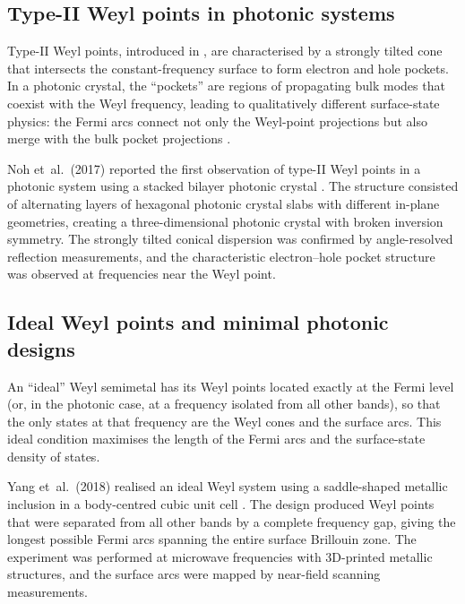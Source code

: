 \subsection{Type-II Weyl points in photonic systems}
\label{sec:ch15-type-ii-exp}

Type-II Weyl points, introduced in , are
characterised by a strongly tilted cone that intersects the
constant-frequency surface to form electron and hole pockets.  In a
photonic crystal, the ``pockets'' are regions of propagating bulk
modes that coexist with the Weyl frequency, leading to qualitatively
different surface-state physics: the Fermi arcs connect not only the
Weyl-point projections but also merge with the bulk pocket
projections \cite{ozawa2018topological}.

Noh et~al.\ (2017) reported the first observation of type-II Weyl
points in a photonic system using a stacked bilayer photonic crystal
\cite{noh2017experimental}.  The structure consisted of alternating
layers of hexagonal photonic crystal slabs with different in-plane
geometries, creating a three-dimensional photonic crystal with
broken inversion symmetry.  The strongly tilted conical dispersion
was confirmed by angle-resolved reflection measurements, and the
characteristic electron--hole pocket structure was observed at
frequencies near the Weyl point.

\subsection{Ideal Weyl points and minimal photonic designs}
\label{sec:ch15-ideal-weyl}

An ``ideal'' Weyl semimetal has its Weyl points located exactly at the
Fermi level (or, in the photonic case, at a frequency isolated from
all other bands), so that the only states at that frequency are the
Weyl cones and the surface arcs.  This ideal condition maximises the
length of the Fermi arcs and the surface-state density of states.

Yang et~al.\ (2018) realised an ideal Weyl system using a
saddle-shaped metallic inclusion in a body-centred cubic unit cell
\cite{yang2018realization,yang2017discovery}.  The design produced Weyl points that
were separated from all other bands by a complete frequency gap,
giving the longest possible Fermi arcs spanning the entire surface
Brillouin zone.  The experiment was performed at microwave
frequencies with 3D-printed metallic structures, and the surface arcs
were mapped by near-field scanning measurements.


